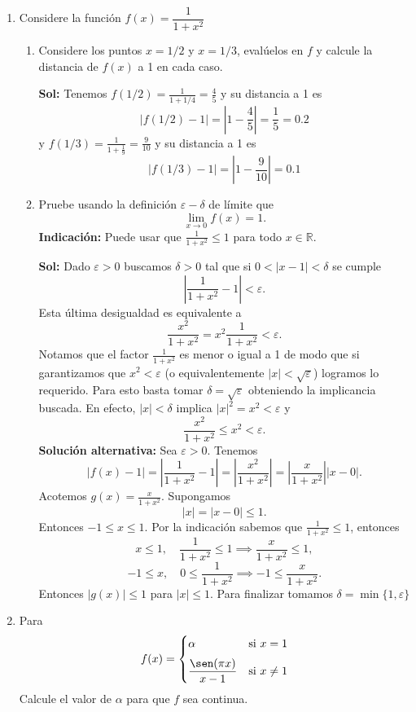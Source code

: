 \documentclass[letterpaper,12pt]{article}
\theoremstyle{plain}
\theoremstyle{definition}
\newcommand{\1}{\mathbbm{1}}
\begin{document}
\begin{enumerate}[label=\textbf{P\arabic*.}, itemsep=0cm]
\item Considere la función $f(x)=\dfrac{1}{1+x^2}$

\begin{enumerate}
    \item Considere los puntos $x=1/2$ y $x=1/3$, evalúelos en $f$ y calcule la distancia de $f(x)$ a 1 en cada caso.


\color{blue}
\textbf{Sol:}
Tenemos $f(1/2) = \frac{1}{1+1/4} = \frac{4}{5}$ y su distancia a 1 es
\[
|f(1/2) - 1| = \left| 1 - \frac{4}{5} \right| = \frac{1}{5} = 0.2
\]
y $f(1/3) = \frac{1}{1+\frac{1}{9}} = \frac{9}{10}$ y su distancia a 1 es
\[
|f(1/3) - 1| = \left| 1 - \frac{9}{10} \right| = 0.1
\]
\color{black}
    
    \item Pruebe usando la definición $\varepsilon-\delta$ de límite que
\[
\lim_{x \to 0} f(x) = 1.
\]
\noindent
\textbf{Indicaci\'on:} Puede usar que $\frac{1}{1+x^2} \leq 1$ para todo $x \in \mathbb{R}$.

\color{blue}
\textbf{Sol:}
Dado $\varepsilon > 0$ buscamos $\delta > 0$ tal que si $0 < |x - 1| < \delta$ se cumple
\[
\left| \frac{1}{1+x^2} - 1 \right| < \varepsilon.
\]
Esta última desigualdad es equivalente a
\[
\frac{x^2}{1+x^2} = x^2 \frac{1}{1+x^2} < \varepsilon.
\]
Notamos que el factor $\frac{1}{1+x^2}$ es menor o igual a 1 de modo que si garantizamos que $x^2 < \varepsilon$ (o equivalentemente $|x| < \sqrt{\varepsilon}$) logramos lo requerido. Para esto basta tomar $\delta = \sqrt{\varepsilon}$ obteniendo la implicancia buscada. En efecto, $|x| < \delta$ implica $|x|^2 = x^2 < \varepsilon$ y
\[
\frac{x^2}{1+x^2} \leq x^2 < \varepsilon.
\]
\textbf{Solución alternativa:}
Sea $\varepsilon > 0$. Tenemos
\[
|f(x) - 1| = \left| \frac{1}{1+x^2} - 1 \right| = \left| \frac{x^2}{1+x^2} \right| = \left| \frac{x}{1+x^2} \right| |x - 0|.
\]
Acotemos $g(x) = \frac{x}{1+x^2}$. Supongamos
\[
|x| = |x - 0| \leq 1.
\]
Entonces $-1 \leq x \leq 1$. Por la indicación sabemos que $\frac{1}{1+x^2} \leq 1$, entonces
\[
x \leq 1, \quad \frac{1}{1+x^2} \leq 1 \implies \frac{x}{1+x^2} \leq 1,
\]
\[
-1 \leq x, \quad 0 \leq \frac{1}{1+x^2} \implies -1 \leq \frac{x}{1+x^2}.
\]
Entonces $|g(x)| \leq 1$ para $|x| \leq 1$. Para finalizar tomamos $\delta = \min\{1, \varepsilon\}$
\color{black}

\end{enumerate}

\item Para  
$$f(x) = 
\begin{cases}
\vspace{0.2cm}
\alpha & \text{si } x = 1 \\
\dfrac{\sen(\pi x)}{x - 1} & \text{si } x \ne 1
\end{cases} $$
Calcule el valor de \( \alpha \) para que \( f \) sea continua.


\end{enumerate}
\end{document}
